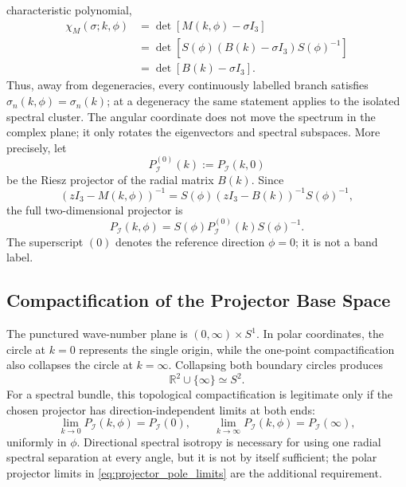 \documentclass[11pt]{article}
\numberwithin{equation}{section}
\begin{document}
characteristic polynomial,
\begin{align}
  \chi_M(\sigma;k,\phi)
  &=
  \det[M(k,\phi)-\sigma I_3]\nonumber\\
  &=
  \det[S(\phi)(B(k)-\sigma I_3)S(\phi)^{-1}]\nonumber\\
  &=
  \det[B(k)-\sigma I_3].
  \label{eq:direction_independent_characteristic}
\end{align}
Thus, away from degeneracies, every continuously labelled branch satisfies
$\sigma_n(k,\phi)=\sigma_n(k)$; at a degeneracy the same statement applies
to the isolated spectral cluster. The angular coordinate does not move the
spectrum in the complex plane; it only rotates the eigenvectors and spectral
subspaces. More precisely, let
\begin{equation}
  P_{\mathcal I}^{(0)}(k):=P_{\mathcal I}(k,0)
\end{equation}
be the Riesz projector of the radial matrix $B(k)$. Since
\begin{equation}
  (zI_3-M(k,\phi))^{-1}
  =S(\phi)(zI_3-B(k))^{-1}S(\phi)^{-1},
\end{equation}
the full two-dimensional projector is
\begin{equation}
  P_{\mathcal I}(k,\phi)=
  S(\phi)P_{\mathcal I}^{(0)}(k)S(\phi)^{-1}.
  \label{eq:projector_rotational_covariance}
\end{equation}
The superscript $(0)$ denotes the reference direction $\phi=0$; it is not
a band label.

\subsection{Compactification of the Projector Base Space}

The punctured wave-number plane is $(0,\infty)\times S^1$. In polar
coordinates, the circle at $k=0$ represents the single origin, while the
one-point compactification also collapses the circle at $k=\infty$.
Collapsing both boundary circles produces
\begin{equation}
  \mathbb R^2\cup\{\infty\}\simeq S^2.
  \label{eq:wavenumber_compactification}
\end{equation}
For a spectral bundle, this topological compactification is legitimate
only if the chosen projector has direction-independent limits at both
ends:
\begin{equation}
  \lim_{k\to0}P_{\mathcal I}(k,\phi)=P_{\mathcal I}(0),
  \qquad
  \lim_{k\to\infty}P_{\mathcal I}(k,\phi)=P_{\mathcal I}(\infty),
  \label{eq:projector_pole_limits}
\end{equation}
uniformly in $\phi$. Directional spectral isotropy is necessary for using
one radial spectral separation at every angle, but it is not by itself
sufficient; the polar projector limits in
\eqref{eq:projector_pole_limits} are the additional requirement.
\end{document}
